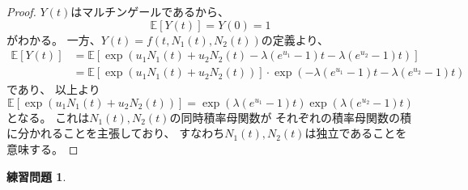 \documentclass[uplatex]{jsarticle}
\theoremstyle{definition}
\newtheorem{prob}[prob]{練習問題}
\def\E{\mathbb{E}}
\begin{document}
\begin{proof}
  \(Y(t)\)はマルチンゲールであるから、
  \[
  \E[Y(t)] = Y(0) = 1
  \]
  がわかる。
  一方、\(Y(t)=f(t,N_1(t),N_2(t))\)の定義より、
  \begin{align*}
    \E[Y(t)]
    &= \E \left[  \exp \left( u_1N_1(t) + u_2N_2(t)
    - \lambda (e^{u_1}-1)t - \lambda (e^{u_2}-1)t\right) \right] \\
    &= \E \left[  \exp \left( u_1N_1(t) + u_2N_2(t)\right) \right]
    \cdot \exp\left( - \lambda (e^{u_1}-1)t - \lambda (e^{u_2}-1)t\right)
  \end{align*}
  であり、
  以上より
  \[
  \E \left[  \exp \left( u_1N_1(t) + u_2N_2(t)\right) \right]
  = \exp \left( \lambda (e^{u_1}-1)t\right)
  \exp \left(\lambda (e^{u_2}-1)t\right)
  \]
  となる。
  これは\(N_1(t),N_2(t)\)の同時積率母関数が
  それぞれの積率母関数の積に分かれることを主張しており、
  すなわち\(N_1(t),N_2(t)\)は独立であることを意味する。
\end{proof}








\begin{prob}\label{prob: 11.6}
\end{prob}
\end{document}
